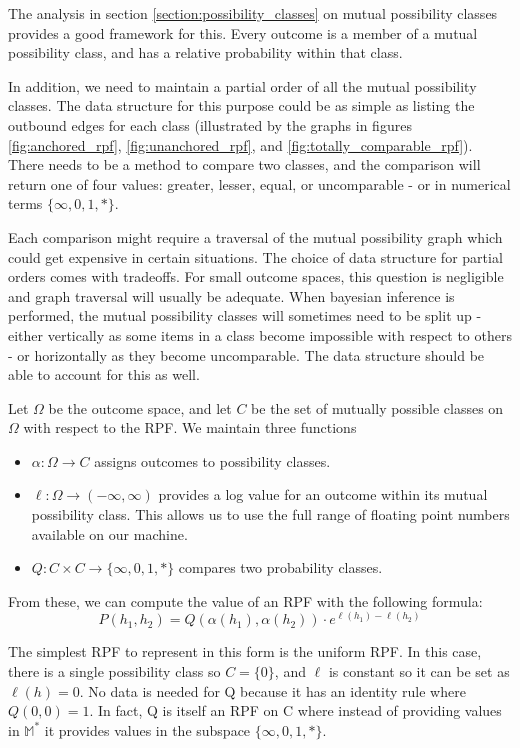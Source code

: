 \documentclass[twoside]{article}
\theoremstyle{plain}%
\theoremstyle{definition}
\theoremstyle{remark}
\begin{document}
The analysis in section \ref{section:possibility_classes} on mutual possibility classes provides a good framework for this. Every outcome is a member of a mutual possibility class, and has a relative probability within that class.

In addition, we need to maintain a partial order of all the mutual possibility classes. The data structure for this purpose could be as simple as listing the outbound edges for each class (illustrated by the graphs in figures \ref{fig:anchored_rpf}, \ref{fig:unanchored_rpf}, and \ref{fig:totally_comparable_rpf}). There needs to be a method to compare two classes, and the comparison will return one of four values: greater, lesser, equal, or uncomparable - or in numerical terms \(\{\infty, 0, 1, \ast\}\).

Each comparison might require a traversal of the mutual possibility graph which could get expensive in certain situations. The choice of data structure for partial orders comes with tradeoffs. For small outcome spaces, this question is negligible and graph traversal will usually be adequate. When bayesian inference is performed, the mutual possibility classes will sometimes need to be split up - either vertically as some items in a class become impossible with respect to others - or horizontally as they become uncomparable. The data structure should be able to account for this as well.

Let \(\Omega\) be the outcome space, and let \(C\) be the set of mutually possible classes on \(\Omega\) with respect to the RPF. We maintain three functions 

\begin{itemize}
\item \(\alpha: \Omega \rightarrow C\) assigns outcomes to possibility classes.
\item \(\ell: \Omega \rightarrow (-\infty, \infty)\) provides a log value for an outcome within its mutual possibility class. This allows us to use the full range of floating point numbers available on our machine.
\item \(Q: C \times C \rightarrow \{\infty, 0, 1, \ast\}\) compares two probability classes.
\end{itemize}

From these, we can compute the value of an RPF with the following formula:
\[P(h_1, h_2) = Q(\alpha(h_1), \alpha(h_2)) \cdot e^{\ell(h_1) - \ell(h_2)}\]

The simplest RPF to represent in this form is the uniform RPF. In this case, there is a single possibility class so \(C = \{0\}\), and \(\ell\) is constant so it can be set as \(\ell(h) = 0\). No data is needed for Q because it has an identity rule where \(Q(0, 0) = 1\). In fact, Q is itself an RPF on C where instead of providing values in \(\mathbb{M}^{\ast}\) it provides values in the subspace \(\{\infty, 0, 1, \ast\}\).
\end{document}
